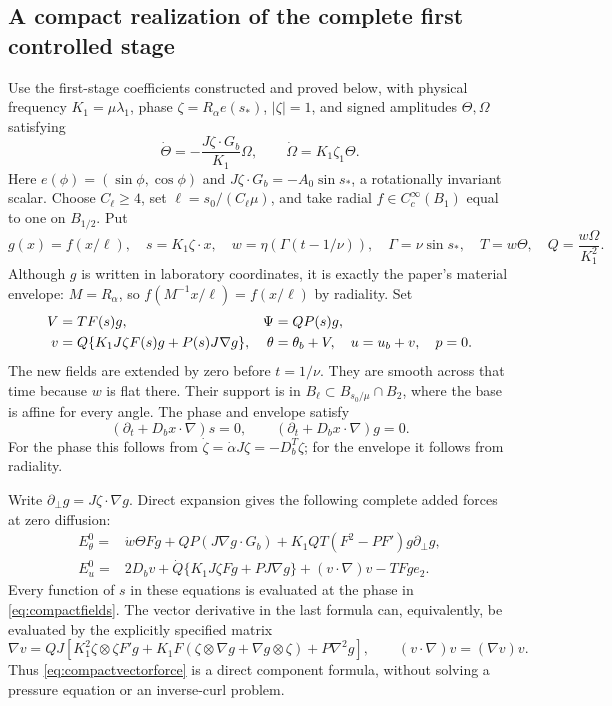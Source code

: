 \subsection{A compact realization of the complete first controlled stage}
Use the first-stage coefficients constructed and proved below, with
physical frequency $K_1=\mu\lambda_1$, phase $\zeta=R_\alpha e(s_*)$,
$|\zeta|=1$, and signed amplitudes $\Theta,\Omega$ satisfying
\begin{equation}
 \dot\Theta=-\frac{J\zeta\cdot G_b}{K_1}\Omega,
 \qquad \dot\Omega=K_1\zeta_1\Theta.
 \label{eq:firstphysicalpair}
\end{equation}
Here $e(\phi)=(\sin\phi,\cos\phi)$ and
$J\zeta\cdot G_b=-A_0\sin s_*$, a rotationally invariant scalar.
Choose $C_\ell\geq4$, set $\ell=s_0/(C_\ell\mu)$, and take
radial $f\in C_c^\infty(B_1)$ equal to one on $B_{1/2}$.
Put
\[
 g(x)=f(x/\ell),\quad s=K_1\zeta\cdot x,\quad
 w=\eta(\Gamma(t-1/\nu)),\quad \Gamma=\nu\sin s_*,
 \quad T=w\Theta,\quad Q=\frac{w\Omega}{K_1^2}.
\]
Although $g$ is written in laboratory coordinates, it is exactly
the paper's material envelope: $M=R_\alpha$, so
$f(M^{-1}x/\ell)=f(x/\ell)$ by radiality. Set
\begin{align}
 V&=TF(s)g,& \Psi&=QP(s)g,\notag\\
 v&=Q\{K_1J\zeta F(s)g+P(s)J\nabla g\},&
 \theta&=\theta_b+V,\quad u=u_b+v,\quad p=0.
 \label{eq:compactfields}
\end{align}
The new fields are extended by zero before $t=1/\nu$. They are
smooth across that time because $w$ is flat there. Their support
is in $B_\ell\subset B_{s_0/\mu}\cap B_2$, where the base is
affine for every angle. The phase and envelope satisfy
\[
 (\partial_t+D_bx\cdot\nabla)s=0,
 \qquad (\partial_t+D_bx\cdot\nabla)g=0.
\]
For the phase this follows from
$\dot\zeta=\dot\alpha J\zeta=-D_b^T\zeta$; for the
envelope it follows from radiality.

Write $\partial_\perp g=J\zeta\cdot\nabla g$. Direct expansion
gives the following complete added forces at zero diffusion:
\begin{align}
 E^0_\theta={}&\dot w\Theta Fg+
 QP(J\nabla g\cdot G_b)
 +K_1QT(F^2-PF')g\partial_\perp g,
 \label{eq:compactscalarforce}\\
 E^0_u={}&2D_bv+
 \dot Q\{K_1J\zeta Fg+PJ\nabla g\}
 +(v\cdot\nabla)v-TFg e_2.
 \label{eq:compactvectorforce}
\end{align}
Every function of $s$ in these equations is evaluated at the phase
in \eqref{eq:compactfields}. The vector derivative in the last formula
can, equivalently, be evaluated by the explicitly specified matrix
\[
 \nabla v=QJ\left[
 K_1^2\zeta\otimes\zeta F'g
 +K_1F(\zeta\otimes\nabla g+\nabla g\otimes\zeta)
 +P\nabla^2g\right],\qquad
 (v\cdot\nabla)v=(\nabla v)v.
\]
Thus \eqref{eq:compactvectorforce} is a direct component formula,
without solving a pressure equation or an inverse-curl problem.

